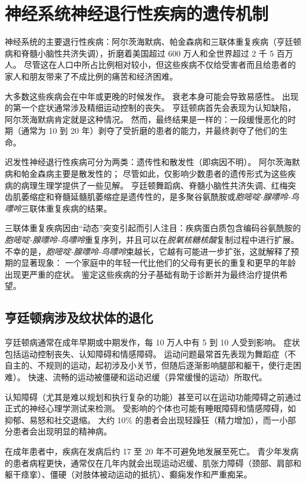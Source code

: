 \chapter{神经系统神经退行性疾病的遗传机制} \label{chap:chap63}

神经系统的主要退行性疾病：阿尔茨海默病、帕金森病和三联体重复疾病（亨廷顿病和脊髓小脑性共济失调），折磨着美国超过 600 万人和全世界超过 2 千 5 百万人。
尽管这在人口中所占比例相对较小，但这些疾病不仅给受害者而且给患者的家人和朋友带来了不成比例的痛苦和经济困难。


大多数这些疾病会在中年或更晚的时候发作。
衰老本身可能会导致易感性。
出现的第一个症状通常涉及精细运动控制的丧失。
亨廷顿病首先会表现为认知缺陷，阿尔茨海默病肯定就是这种情况。
然而，最终结果是一样的：一段缓慢恶化的时期（通常为 10 到 20 年）剥夺了受折磨的患者的能力，并最终剥夺了他们的生命。


迟发性神经退行性疾病可分为两类：遗传性和散发性（即病因不明）。
阿尔茨海默病和帕金森病主要是散发性的；
尽管如此，仅影响少数患者的遗传形式为这些疾病的病理生理学提供了一些见解。
亨廷顿舞蹈病、脊髓小脑性共济失调、红梅突齿肌萎缩症和脊髓延髓肌萎缩症是遗传性的，是多聚谷氨酰胺或\textit{胞嘧啶-腺嘌呤-鸟嘌呤}三联体重复疾病的结果。


三联体重复疾病因由“动态”突变引起而引人注目：疾病蛋白质包含编码谷氨酰胺的\textit{胞嘧啶-腺嘌呤-鸟嘌呤}重复序列，并且可以在\textit{脱氧核糖核酸}复制过程中进行扩展。
不幸的是，\textit{胞嘧啶-腺嘌呤-鸟嘌呤}束越长，它越有可能进一步扩张，这就解释了预期的显著现象：
一个家庭中的年轻一代比他们的父母有更长的重复和更早的年龄出现更严重的症状。
鉴定这些疾病的分子基础有助于诊断并为最终治疗提供希望。



\section{亨廷顿病涉及纹状体的退化}

亨廷顿病通常在成年早期或中期发作，每 10 万人中有 5 到 10 人受到影响。
症状包括运动控制丧失、认知障碍和情感障碍。
运动问题最常首先表现为舞蹈症（不自主的、不规则的运动，起初涉及小关节，但随后逐渐影响腿部和躯干，使行走困难）。
快速、流畅的运动被僵硬和运动迟缓（异常缓慢的运动）所取代。


认知障碍（尤其是难以规划和执行复杂的功能）甚至可以在运动功能障碍之前通过正式的神经心理学测试来检测。
受影响的个体也可能有睡眠障碍和情感障碍，如抑郁、易怒和社交退缩。
大约 10\% 的患者会出现轻躁狂（精力增加），而一小部分患者会出现明显的精神病。


在成年患者中，疾病在发病后约 17 至 20 年不可避免地发展至死亡。
青少年发病的患者病程更快，通常仅在几年内就会出现运动迟缓、肌张力障碍（颈部、肩部和躯干痉挛）、僵硬（对肢体被动运动的抵抗）、癫痫发作和严重痴呆。



